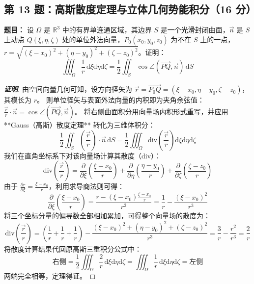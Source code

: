 \documentclass[11pt,a4paper]{article}
\newcommand{\dd}{\mathrm{d}}
\begin{document}
	\begin{tcolorbox}[examstyle]
		\subsection*{第 13 题：高斯散度定理与立体几何势能积分（16 分）}
		\textbf{题目：} 设 $\Omega$ 是 $\mathbb{R}^3$ 中的有界单连通区域，其边界 $S$ 是一个光滑封闭曲面，$\vec{n}$ 是 $S$ 上动点 $Q(\xi,\eta,\zeta)$ 处的单位外法向量，$P_0(x_0,y_0,z_0)$ 为不在 $S$ 上的一点，$r = \sqrt{(\xi-x_0)^2 + (\eta-y_0)^2 + (\zeta-z_0)^2}$。证明：
		$$ \iiint_\Omega \frac{1}{r} \,\dd\xi\dd\eta\dd\zeta = \frac{1}{2} \iint_S \cos\angle(\vec{PQ}, \vec{n}) \,\dd S $$
		
		\begin{proof}[\textbf{证明}]
			由空间向量几何可知，设方向径矢为 $\vec{r} = \vec{P_0Q} = (\xi-x_0, \eta-y_0, \zeta-z_0)$，其模长为 $r$。
			则单位径矢与表面外法向量的内积即为夹角余弦值：$\frac{\vec{r}}{r} \cdot \vec{n} = \cos\angle(\vec{PQ}, \vec{n})$。
			将右侧曲面积分用向量场内积形式重写，并应用 **Gauss（高斯）散度定理** 转化为三维体积分：
			$$ \frac{1}{2} \iint_S \left(\frac{\vec{r}}{r}\right) \cdot \vec{n} \,\dd S = \frac{1}{2} \iiint_\Omega \text{div}\left( \frac{\vec{r}}{r} \right) \dd\xi\dd\eta\dd\zeta $$
			我们在直角坐标系下对该向量场计算其散度（$\text{div}$）：
			$$ \text{div}\left( \frac{\vec{r}}{r} \right) = \frac{\partial}{\partial \xi}\left(\frac{\xi-x_0}{r}\right) + \frac{\partial}{\partial \eta}\left(\frac{\eta-y_0}{r}\right) + \frac{\partial}{\partial \zeta}\left(\frac{\zeta-z_0}{r}\right) $$
			由于 $\frac{\partial r}{\partial \xi} = \frac{\xi-x_0}{r}$，利用求导商法则可得：
			$$ \frac{\partial}{\partial \xi}\left(\frac{\xi-x_0}{r}\right) = \frac{r - (\xi-x_0)\frac{\xi-x_0}{r}}{r^2} = \frac{1}{r} - \frac{(\xi-x_0)^2}{r^3} $$
			将三个坐标分量的偏导数全部相加累加，可得整个向量场的散度为：
			$$ \text{div}\left( \frac{\vec{r}}{r} \right) = \left( \frac{1}{r} + \frac{1}{r} + \frac{1}{r} \right) - \frac{(\xi-x_0)^2+(\eta-y_0)^2+(\zeta-z_0)^2}{r^3} = \frac{3}{r} - \frac{r^2}{r^3} = \frac{2}{r} $$
			将散度计算结果代回原高斯三重积分公式中：
			$$ \text{右侧} = \frac{1}{2} \iiint_\Omega \frac{2}{r} \,\dd\xi\dd\eta\dd\zeta = \iiint_\Omega \frac{1}{r} \,\dd\xi\dd\eta\dd\zeta = \text{左侧} $$
			两端完全相等，定理得证。
		\end{proof}
	\end{tcolorbox}
	
\end{document}
